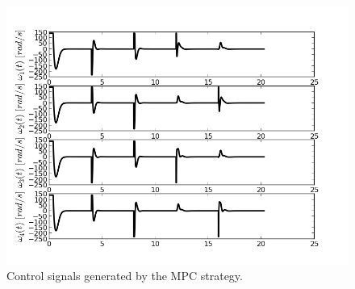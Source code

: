 \begin{figure}[h!]
\centering
\includegraphics[scale=0.7]{Images/Chapter5/ardrone/control_signals.png}
\caption{Control signals generated by the MPC strategy.}
\label{fig:ardrone_inputs}
\end{figure}

